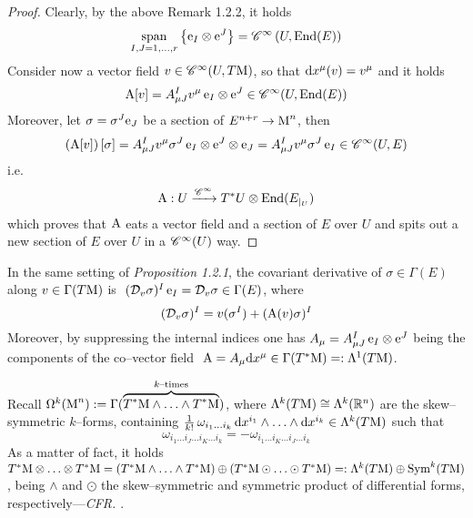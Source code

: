 \begin{proof}
    Clearly, by the above Remark 1.2.2, it holds
    $$\mathop{\operatorname{span}}_{I,J=1,\hdots,r}\left\{\text{\normalfont e}_I\otimes\text{\normalfont e}^J\right\}=\mathscr{C}^\infty\left(U,\text{\normalfont End}(E)\right)$$
    Consider now a vector field $v\in\mathscr{C}^\infty(U,T\text{\normalfont M})$, so that $\text{\normalfont d} x^\mu(v)=v^\mu$ and it holds
    $$\text{\normalfont A}[v]= A^I_{\mu J}v^\mu\,\text{\normalfont e}_I\otimes\text{\normalfont e}^J\in\mathscr{C}^\infty(U,\text{\normalfont End}(E))$$
    Moreover, let $\sigma=\sigma^J\text{\normalfont e}_J$ be a section of $E^{n+r}\to\text{\normalfont M}^n$, then
    $$\left(\text{\normalfont A}[v]\right)[\sigma]= A^I_{\mu J}v^\mu\sigma^J\,\text{\normalfont e}_I\otimes\text{\normalfont e}^J\otimes\text{\normalfont e}_J= A^I_{\mu J}v^\mu\sigma^J\,\text{\normalfont e}_I\in\mathscr{C}^\infty(U,E)$$
   i.e.
    $$\text{\normalfont A}:U\xrightarrow{\mathscr{C}^\infty}T^*U\otimes\text{\normalfont End}(E_{|_U})$$
    which proves that $\text{\normalfont A}$ eats a vector field and a section of $E$ over $U$ and spits out a new section of $E$ over $U$ in a $\mathscr{C}^\infty(U)$ way.
\end{proof}

\begin{cor}
    In the same setting of \emph{Proposition 1.2.1}, the covariant derivative of $\sigma\in\Gamma(E)$ along $v\in\Gamma(T\text{\normalfont M})$ is \,\,$(\mathcal{D}_v\sigma)^I\,\text{\normalfont e}_I=\mathcal{D}_v\sigma\in\Gamma(E)$, where
    $$(\mathcal{D}_v\sigma)^I=v(\sigma^I)+(\text{\normalfont A}(v)\sigma)^I$$
    Moreover, by suppressing the internal indices one has $A_\mu= A^I_{\mu J}\,\text{\normalfont e}_I\otimes\text{\normalfont e}^J$ being the components of the co--vector field
    \,\,$\text{\normalfont A}=A_{\mu}\text{\normalfont d} x^\mu\in\Gamma(T^*\text{\normalfont M})=:\Lambda^1(T\text{\normalfont M})$.
\end{cor}

\begin{note}
    Recall $\Omega^k(\text{\normalfont M}^n):=\Gamma(\overbrace{T^*\text{\normalfont M}\wedge\hdots\wedge T^*\text{\normalfont M}}^{k\text{--times}})$, where $\Lambda^k(T\text{\normalfont M})\cong\Lambda^k(\mathbb{R}^n)$ are the skew--symmetric $k$--forms, containing $\frac{1}{k!}\,\omega_{i_1\hdots i_k}\,\text{\normalfont d} x^{i_1}\wedge\hdots\wedge\text{\normalfont d} x^{i_k}\in\Lambda^k(T\text{\normalfont M})$ such that
    $$\omega_{i_1\hdots i_J\hdots i_K\hdots i_k}=-\omega_{i_1\hdots i_K\hdots i_J\hdots i_k}$$
As a matter of fact, it holds $T^*\text{\normalfont M}\otimes\hdots\otimes T^*\text{\normalfont M}=(T^*\text{\normalfont M}\wedge\hdots\wedge T^*\text{\normalfont M})\oplus(T^*\text{\normalfont M}\odot\hdots\odot T^*\text{\normalfont M})=:\Lambda^k(T\text{\normalfont M})\oplus\text{\normalfont Sym}^k(T\text{\normalfont M})$, being $\wedge$ and $\odot$ the skew--symmetric and symmetric product of differential forms, respectively---\emph{CFR. \cite{lee_smooth}}.
\end{note}

